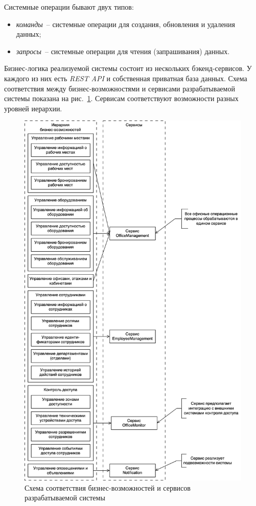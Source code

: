Системные операции бывают двух типов:
\begin{itemize}
    \item \textit{команды}~-- системные операции для создания, обновления и удаления данных;
    \item \textit{запросы}~-- системные операции для чтения (запрашивания) данных.
\end{itemize}

Бизнес-логика реализуемой системы состоит из нескольких бэкенд-сервисов. У каждого из них есть \textit{REST API} и собственная приватная база данных. Схема соответствия между бизнес-возможностями и сервисами разрабатываемой системы показана на рис.~\ref{fig:system-design:architectural-pattern-design:microservices-business-use-case}. Сервисам соответствуют возможности разных уровней иерархии.

\begin{figure}
\centering
    \includegraphics[width=0.8\linewidth]{assets/microservices-business-use-cases.png}
    \caption{Схема соответствия бизнес-возможностей и сервисов разрабатываемой системы}
    \label{fig:system-design:architectural-pattern-design:microservices-business-use-case}
\end{figure}

